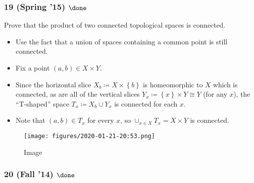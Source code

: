 \hypertarget{spring-15-done-1}{%
\subsubsection{\texorpdfstring{19 (Spring '15)
\(\done\)}{19 (Spring '15) \textbackslash done}}\label{spring-15-done-1}}

\begin{problem}[?]

Prove that the product of two connected topological spaces is connected.

\end{problem}

\begin{solution}

\envlist

\begin{itemize}
\item
  Use the fact that a union of spaces containing a common point is still
  connected.
\item
  Fix a point \((a, b) \in X \times Y\).
\item
  Since the horizontal slice \(X_b\coloneqq X \times\left\{{b}\right\}\)
  is homeomorphic to \(X\) which is connected, as are all of the
  vertical slices \(Y_x \coloneqq\left\{{x}\right\} \times Y \cong Y\)
  (for any \(x\)), the ``T-shaped'' space \(T_x \coloneqq X_b \cup Y_x\)
  is connected for each \(x\).
\item
  Note that \((a, b) \in T_x\) for every \(x\), so
  \(\cup_{x\in X} T_x = X \times Y\) is connected.
\end{itemize}

\begin{figure}
\centering
\texttt{[image: figures/2020-01-21-20:53.png]}
\caption{Image}
\end{figure}

\end{solution}

\hypertarget{fall-14-done}{%
\subsubsection{\texorpdfstring{20 (Fall '14)
\(\done\)}{20 (Fall '14) \textbackslash done}}\label{fall-14-done}}

